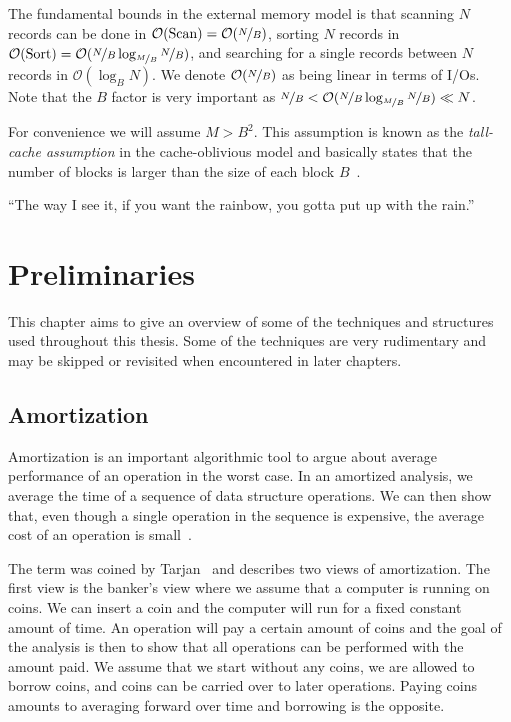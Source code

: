 \documentclass[twoside,11pt,openright]{report}
\begin{document}
The fundamental bounds in the external memory model is that scanning $N$ records can be done in $\mathcal{O}(\text{Scan}) = \mathcal{O}(\nicefrac{N}{B})$, sorting $N$ records in $\mathcal{O}(\text{Sort}) = \mathcal{O}(\nicefrac{N}{B} \log_{\nicefrac{M}{B}}\nicefrac{N}{B})$, and searching for a single records between $N$ records in $\mathcal{O}(\log_B N)$. We denote $\mathcal{O}(\nicefrac{N}{B})$ as being linear in terms of I/Os. Note that the $B$ factor is very important as $\nicefrac{N}{B} < \mathcal{O}(\nicefrac{N}{B} \log_{\nicefrac{M}{B}}\nicefrac{N}{B}) \ll N$.

For convenience we will assume $M > B^2$. This assumption is known as the \textit{tall-cache assumption} in the cache-oblivious model and basically states that the number of blocks  is larger than the size of each block $B$~\cite{Prokop99cache-obliviousalgorithms}.

\begin{savequote}[0.42\textwidth]
``The way I see it, if you want the rainbow, you gotta put up with the rain.''
\end{savequote}
\chapter{Preliminaries}
\label{chp:prelims}
This chapter aims to give an overview of some of the techniques and structures used throughout this thesis. Some of the techniques are very rudimentary and may be skipped or revisited when encountered in later chapters.

\section{Amortization}
Amortization is an important algorithmic tool to argue about average performance of an operation in the worst case.
In an amortized analysis, we average the time of a sequence of data structure operations. We can then show that, even though a single operation in the sequence is expensive, the average cost of an operation is small~\cite[p.~451-452]{clrs}.

The term was coined by Tarjan~\cite{Tarjan85} and describes two views of amortization. The first view is the banker's view where we assume that a computer is running on coins. We can insert a coin and the computer will run for a fixed constant amount of time. An operation will pay a certain amount of coins and the goal of the analysis is then to show that all operations can be performed with the amount paid. We assume that we start without any coins, we are allowed to borrow coins, and coins can be carried over to later operations. Paying coins amounts to averaging forward over time and borrowing is the opposite.
\end{document}
